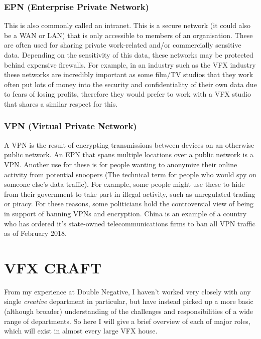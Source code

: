 \hypertarget{epn-enterprise-private-network}{%
\subsubsection{EPN (Enterprise Private Network)}\label{epn-enterprise-private-network}}

This is also commonly called an intranet. This is a secure network (it could also be a WAN or LAN) that is only accessible to members of an organisation. These are often used for sharing private work-related and/or commercially sensitive data. Depending on the sensitivity of this data, these networks may be protected behind expensive firewalls. For example, in an industry such as the VFX industry these networks are incredibly important as some film/TV studios that they work often put lots of money into the security and confidentiality of their own data due to fears of losing profits, therefore they would prefer to work with a VFX studio that shares a similar respect for this.

\hypertarget{vpn-virtual-private-network}{%
\subsubsection{VPN (Virtual Private Network)}\label{vpn-virtual-private-network}}

A VPN is the result of encrypting transmissions between devices on an otherwise public network. An EPN that spans multiple locations over a public network is a VPN. Another use for these is for people wanting to anonymize their online activity from potential snoopers (The technical term for people who would spy on someone else's data traffic). For example, some people might use these to hide from their government to take part in illegal activity, such as unregulated trading or piracy. For these reasons, some politicians hold the controversial view of being in support of banning VPNs and encryption. China is an example of a country who has ordered it's state-owned telecommunications firms to ban all VPN traffic as of February 2018.

\pagebreak\hypertarget{vfx-craft}{%
\section{VFX CRAFT}\label{vfx-craft}}

From my experience at Double Negative, I haven't worked very closely with any single \emph{creative} department in particular, but have instead picked up a more basic (although broader) understanding of the challenges and responsibilities of a wide range of departments. So here I will give a brief overview of each of major roles, which will exist in almost every large VFX house.

